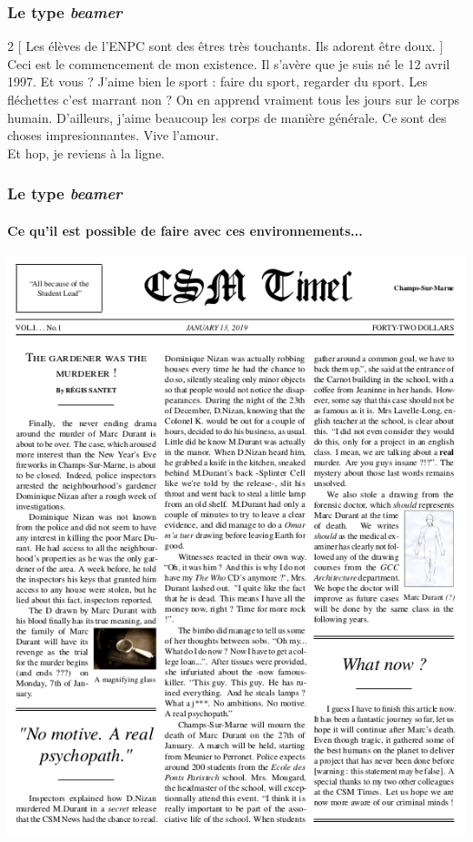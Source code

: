 \documentclass[handout]{beamer}
\begin{document}
\begin{frame}
	\frametitle{Le type \textit{beamer}}

	\begin{multicols}{2}
	[
	Les élèves de l'ENPC sont des êtres très touchants. Ils adorent être doux.
	]
	Ceci est le commencement de mon existence. Il s'avère que je suis né le 12 avril 1997. Et vous ? J'aime bien le sport : faire du sport, regarder du sport. Les fléchettes c'est marrant non ? On en apprend vraiment tous les jours sur le corps humain. D'ailleurs, j'aime beaucoup les corps de manière générale. Ce sont des choses impresionnantes. Vive l'amour.\\

	\indent Et hop, je reviens à la ligne.
	\end{multicols}

\end{frame}

\begin{frame}
	\frametitle{Le type \textit{beamer}}
	\framesubtitle{Ce qu'il est possible de faire avec ces environnements...}
	\centering
	\includegraphics[scale=0.25]{Images/Beamer/column.png}
\end{frame}
\end{document}
